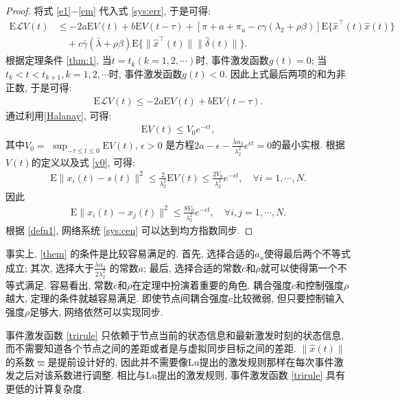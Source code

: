 \begin{proof}
        将式 \eqref{e1}$-$\eqref{em} 代入式 \eqref{sys:err}, 于是可得:
        \begin{align*}
        \mathrm{E}\mathcal{L}V(t)&\leq-2a\mathrm{E}V(t)+b\mathrm{E}V(t-\tau)+[\pi+a+\pi_u-c\gamma(\lambda_2+\rho\beta)]\mathrm{E}\Big\{\hat{x}^\top(t)\hat{x}(t)\Big\}\\
        &\quad+c\bar{\gamma}(\bar{\lambda}+\rho\beta)\mathrm{E}\Big\{\|\hat{x}^{\top}(t)\|\|\hat{{\delta}}(t)\|\Big\}.
        \end{align*}
        根据定理条件 \eqref{thm:1}, 当$t=t_k(k=1,2,\cdots)$时, 事件激发函数$g(t)=0$; 当$t_k<t<t_{k+1}, k=1,2,\cdots$时, 事件激发函数$g(t)<0$. 因此上式最后两项的和为非正数, 于是可得:
        \begin{align}\label{dEVt}
        \mathrm{E}\mathcal{L}V(t)\leq-2a\mathrm{E}V(t)+b\mathrm{E}V(t-\tau).
        \end{align}
        通过利用\autoref{Halanay}, 可得:
        \begin{align}\label{v0}
        \mathrm{E}V(t)\leq V_0e^{-\epsilon t},
        \end{align}
        其中$V_0=$ $\sup_{-\tau\leq t\leq0}\mathrm{E}V(t)$, $\epsilon>0$ 是方程$2a-\epsilon-\frac{\bar{\lambda}\alpha_2}{\lambda^{2}_2}e^{\epsilon t}=0$的最小实根. 根据$V(t)$的定义以及式 \eqref{v0}, 可得:
        \begin{align*}
        \mathrm{E}\|x_i(t)-{s}(t)\|^2\leq\frac{2}{\lambda^2_2}\mathrm{E}V(t)\leq\frac{2V_0}{\lambda_2^2}e^{-\epsilon t},\quad \forall i=1,\cdots,N.
        \end{align*}
        因此
        \begin{align*}
        \mathrm{E}\|x_i(t)-x_j(t)\|^2\leq\frac{8V_0}{\lambda_2^2}e^{-\epsilon t}, \quad\forall i,j=1,\cdots,N.
        \end{align*}
        根据 \autoref{defn1}, 网络系统 \eqref{sys:cen} 可以达到均方指数同步.
        \end{proof}
        \begin{rem}
        事实上, \autoref{them} 的条件是比较容易满足的. 首先, 选择合适的$a_u$使得最后两个不等式成立; 其次, 选择大于$\frac{\bar\lambda\alpha_2}{2\lambda_2^2}$ 的常数$a$; 最后, 选择合适的常数$c$和$\rho$就可以使得第一个不等式满足. 容易看出, 常数$c$和$\rho$在定理中扮演着重要的角色. 耦合强度$c$和控制强度$\rho$ 越大, 定理的条件就越容易满足. 即使节点间耦合强度$c$比较微弱, 但只要控制输入强度$\rho$足够大, 网络依然可以实现同步.
        \end{rem}
        \begin{rem}
        事件激发函数 \eqref{trirule} 只依赖于节点当前的状态信息和最新激发时刻的状态信息, 而不需要知道各个节点之间的差距或者是与虚拟同步目标之间的差距. $\|\hat{x}(t)\|$的系数$\varpi$是提前设计好的, 因此并不需要像Lu提出的激发规则那样在每次事件激发之后对该系数进行调整. 相比与Lu提出的激发规则, 事件激发函数 \eqref{trirule} 具有更低的计算复杂度.
        \end{rem}

